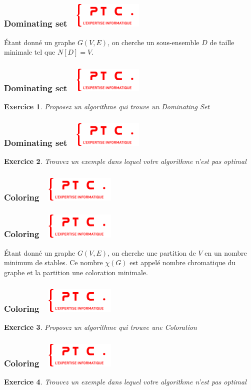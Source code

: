 \documentclass[11pt]{beamer}
\newenvironment{slide}[1]{%
\begin{frame}[environment=slide]
\frametitle{#1~\hfill~\includegraphics[height=1.2cm]{./epitech.png}}
}{%
\end{frame}
}
\newtheorem{exercice}{Exercice}
\begin{document}
\begin{slide}{Dominating set}
\'Etant donné un graphe $G(V,E)$, on cherche un sous-ensemble $D$ de taille minimale tel que $N[D]=V$.
\end{slide}

\begin{slide}{Dominating set}
\begin{exercice}
Proposez un algorithme qui trouve un Dominating Set
\end{exercice}
\end{slide}

\begin{slide}{Dominating set}
\begin{exercice}
Trouvez un exemple dans lequel votre algorithme n'est pas optimal
\end{exercice}
\end{slide}

\begin{slide}{Coloring}
\begin{center}
\end{center}
\end{slide}

\begin{slide}{Coloring}
\'Etant donné un graphe $G(V,E)$, on cherche une partition de $V$ en un nombre minimum de stables. Ce nombre $\chi(G)$ est appelé nombre chromatique du graphe et la partition une coloration minimale.
\end{slide}

\begin{slide}{Coloring}
\begin{exercice}
Proposez un algorithme qui trouve une Coloration
\end{exercice}
\end{slide}

\begin{slide}{Coloring}
\begin{exercice}
Trouvez un exemple dans lequel votre algorithme n'est pas optimal
\end{exercice}
\end{slide}
\end{document}
